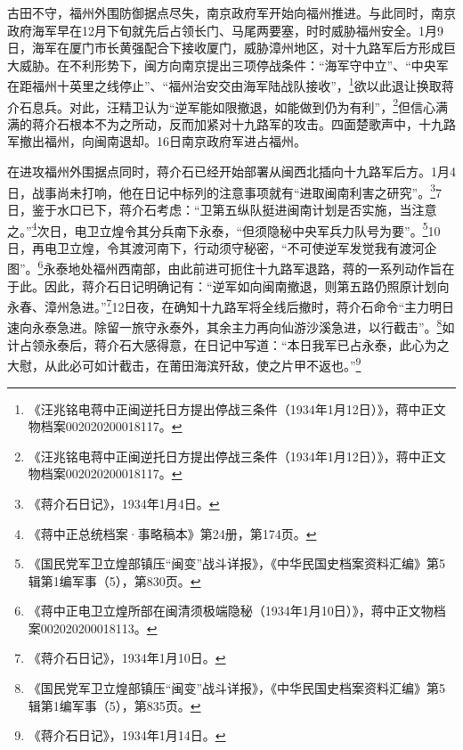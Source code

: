 古田不守，福州外围防御据点尽失，南京政府军开始向福州推进。与此同时，南京政府海军早在12月下旬就先后占领长门、马尾两要塞，时时威胁福州安全。1月9日，海军在厦门市长黄强配合下接收厦门，威胁漳州地区，对十九路军后方形成巨大威胁。在不利形势下，闽方向南京提出三项停战条件：“海军守中立”、“中央军在距福州十英里之线停止”、“福州治安交由海军陆战队接收”，\footnote{《汪兆铭电蒋中正闽逆托日方提出停战三条件（1934年1月12日）》，蒋中正文物档案002020200018117。}欲以此退让换取蒋介石息兵。对此，汪精卫认为“逆军能如限撤退，如能做到仍为有利”，\footnote{《汪兆铭电蒋中正闽逆托日方提出停战三条件（1934年1月12日）》，蒋中正文物档案002020200018117。}但信心满满的蒋介石根本不为之所动，反而加紧对十九路军的攻击。四面楚歌声中，十九路军撤出福州，向闽南退却。16日南京政府军进占福州。


在进攻福州外围据点同时，蒋介石已经开始部署从闽西北插向十九路军后方。1月4日，战事尚未打响，他在日记中标列的注意事项就有“进取闽南利害之研究”。\footnote{《蒋介石日记》，1934年1月4日。}7日，鉴于水口已下，蒋介石考虑：“卫第五纵队挺进闽南计划是否实施，当注意之。”\footnote{《蒋中正总统档案·事略稿本》第24册，第174页。}次日，电卫立煌令其分兵南下永泰，“但须隐秘中央军兵力队号为要”。\footnote{《国民党军卫立煌部镇压“闽变”战斗详报》，《中华民国史档案资料汇编》第5辑第1编军事（5），第830页。}10日，再电卫立煌，令其渡河南下，行动须守秘密，“不可使逆军发觉我有渡河企图”。\footnote{《蒋中正电卫立煌所部在闽清须极端隐秘（1934年1月10日）》，蒋中正文物档案002020200018113。}永泰地处福州西南部，由此前进可扼住十九路军退路，蒋的一系列动作旨在于此。因此，蒋介石日记明确记有：“逆军如向闽南撤退，则第五路仍照原计划向永春、漳州急进。”\footnote{《蒋介石日记》，1934年1月10日。}12日夜，在确知十九路军将全线后撤时，蒋介石命令“主力明日速向永泰急进。除留一旅守永泰外，其余主力再向仙游沙溪急进，以行截击”。\footnote{《国民党军卫立煌部镇压“闽变”战斗详报》，《中华民国史档案资料汇编》第5辑第1编军事（5），第835页。}如计占领永泰后，蒋介石大感得意，在日记中写道：“本日我军已占永泰，此心为之大慰，从此必可如计截击，在莆田海滨歼敌，使之片甲不返也。”\footnote{《蒋介石日记》，1934年1月14日。}


